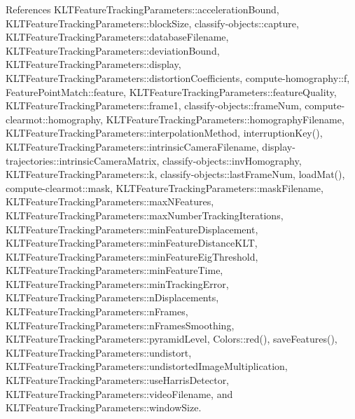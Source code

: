 References K\-L\-T\-Feature\-Tracking\-Parameters\-::acceleration\-Bound, K\-L\-T\-Feature\-Tracking\-Parameters\-::block\-Size, classify-\/objects\-::capture, K\-L\-T\-Feature\-Tracking\-Parameters\-::database\-Filename, K\-L\-T\-Feature\-Tracking\-Parameters\-::deviation\-Bound, K\-L\-T\-Feature\-Tracking\-Parameters\-::display, K\-L\-T\-Feature\-Tracking\-Parameters\-::distortion\-Coefficients, compute-\/homography\-::f, Feature\-Point\-Match\-::feature, K\-L\-T\-Feature\-Tracking\-Parameters\-::feature\-Quality, K\-L\-T\-Feature\-Tracking\-Parameters\-::frame1, classify-\/objects\-::frame\-Num, compute-\/clearmot\-::homography, K\-L\-T\-Feature\-Tracking\-Parameters\-::homography\-Filename, K\-L\-T\-Feature\-Tracking\-Parameters\-::interpolation\-Method, interruption\-Key(), K\-L\-T\-Feature\-Tracking\-Parameters\-::intrinsic\-Camera\-Filename, display-\/trajectories\-::intrinsic\-Camera\-Matrix, classify-\/objects\-::inv\-Homography, K\-L\-T\-Feature\-Tracking\-Parameters\-::k, classify-\/objects\-::last\-Frame\-Num, load\-Mat(), compute-\/clearmot\-::mask, K\-L\-T\-Feature\-Tracking\-Parameters\-::mask\-Filename, K\-L\-T\-Feature\-Tracking\-Parameters\-::max\-N\-Features, K\-L\-T\-Feature\-Tracking\-Parameters\-::max\-Number\-Tracking\-Iterations, K\-L\-T\-Feature\-Tracking\-Parameters\-::min\-Feature\-Displacement, K\-L\-T\-Feature\-Tracking\-Parameters\-::min\-Feature\-Distance\-K\-L\-T, K\-L\-T\-Feature\-Tracking\-Parameters\-::min\-Feature\-Eig\-Threshold, K\-L\-T\-Feature\-Tracking\-Parameters\-::min\-Feature\-Time, K\-L\-T\-Feature\-Tracking\-Parameters\-::min\-Tracking\-Error, K\-L\-T\-Feature\-Tracking\-Parameters\-::n\-Displacements, K\-L\-T\-Feature\-Tracking\-Parameters\-::n\-Frames, K\-L\-T\-Feature\-Tracking\-Parameters\-::n\-Frames\-Smoothing, K\-L\-T\-Feature\-Tracking\-Parameters\-::pyramid\-Level, Colors\-::red(), save\-Features(), K\-L\-T\-Feature\-Tracking\-Parameters\-::undistort, K\-L\-T\-Feature\-Tracking\-Parameters\-::undistorted\-Image\-Multiplication, K\-L\-T\-Feature\-Tracking\-Parameters\-::use\-Harris\-Detector, K\-L\-T\-Feature\-Tracking\-Parameters\-::video\-Filename, and K\-L\-T\-Feature\-Tracking\-Parameters\-::window\-Size.

